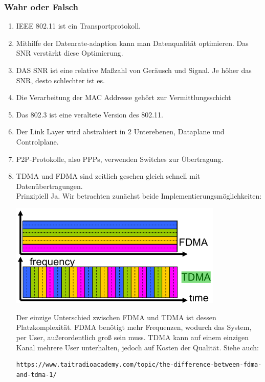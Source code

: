 \documentclass{scrartcl}
\begin{document}
    \subsubsection{Wahr oder Falsch}
    \begin{enumerate}
        \item IEEE 802.11 ist ein Transportprotokoll.
        \item Mithilfe der Datenrate-adaption kann man Datenqualität optimieren. Das SNR verstärkt diese Optimierung.
        \item DAS SNR ist eine relative Maßzahl von Geräusch und Signal. Je höher das SNR, desto schlechter ist es.
        \item Die Verarbeitung der MAC Addresse gehört zur Vermittlungsschicht
        \item Das 802.3 ist eine veraltete Version des 802.11.
        \item Der Link Layer wird abstrahiert in 2 Unterebenen, Dataplane und Controlplane.
        \item P2P-Protokolle, also PPPs, verwenden Switches zur Übertragung.\\
        
        
        \item TDMA und FDMA sind zeitlich gesehen gleich schnell mit Datenübertragungen.\\
        Prinzipiell Ja. Wir betrachten zunächst beide Implementierungsmöglichkeiten:
        \begin{center}
            \includegraphics[width=0.8\textwidth]{TDMAvsFDMA.png}
        \end{center}
        Der einzige Unterschied zwischen FDMA und TDMA ist dessen Platzkomplexität. FDMA benötigt mehr Frequenzen, wodurch das System, per User, außerordentlich groß sein muss.
        TDMA kann auf einem einzigen Kanal mehrere User unterhalten, jedoch auf Kosten der Qualität.
        Siehe auch: 
        \begin{verbatim}
https://www.taitradioacademy.com/topic/the-difference-between-fdma-and-tdma-1/
        \end{verbatim}
        

\end{enumerate}
\end{document}
